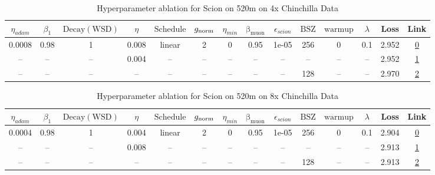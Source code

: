\begin{table}[H]
\centering
\caption{Hyperparameter ablation for Scion on 520m on 4x Chinchilla Data}
\label{tab:ablation_scion_520m_on_4x_chinchilla_data}
\begin{tabular}{cccccccccccccc}
\toprule
$\eta_{adam}$ & $\beta_1$ & $\mathrm{Decay (WSD)}$ & $\eta$ & $\mathrm{Schedule}$ & $g_{\mathrm{norm}}$ & $\eta_{min}$ & $\mathrm{\beta_{muon}}$ & $\epsilon_{scion}$ & $\mathrm{BSZ}$ & $\mathrm{warmup}$ & $\lambda$ & Loss & Link \\
\midrule
0.0008 & 0.98 & 1 & 0.008 & linear & 2 & 0 & 0.95 & 1e-05 & 256 & 0 & 0.1 & 2.952 & \href{https://wandb.ai/marin-community/optimizer-scaling/runs/sweep-520m-42B-scion941d43lr0.008-wd0.1-minlr0-warmup0-b10.98-gn-ab5aa7}{0} \\
\midrule
-- & -- & -- & 0.004 & -- & -- & -- & -- & -- & -- & -- & -- & 2.952 & \href{https://wandb.ai/marin-community/optimizer-scaling/runs/sweep-520m-42B-scion268e92lr0.004-wd0.1-minlr0-warmup0-b10.98-gn-26c45d}{1} \\
-- & -- & -- & -- & -- & -- & -- & -- & -- & 128 & -- & -- & 2.970 & \href{https://wandb.ai/marin-community/optimizer-scaling/runs/sweep-520m-42B-scion32fc90lr0.008-wd0.1-minlr0-warmup0-b10.98-gn-202a50}{2} \\
\bottomrule
\end{tabular}
\end{table}

\begin{table}[H]
\centering
\caption{Hyperparameter ablation for Scion on 520m on 8x Chinchilla Data}
\label{tab:ablation_scion_520m_on_8x_chinchilla_data}
\begin{tabular}{cccccccccccccc}
\toprule
$\eta_{adam}$ & $\beta_1$ & $\mathrm{Decay (WSD)}$ & $\eta$ & $\mathrm{Schedule}$ & $g_{\mathrm{norm}}$ & $\eta_{min}$ & $\mathrm{\beta_{muon}}$ & $\epsilon_{scion}$ & $\mathrm{BSZ}$ & $\mathrm{warmup}$ & $\lambda$ & Loss & Link \\
\midrule
0.0004 & 0.98 & 1 & 0.004 & linear & 2 & 0 & 0.95 & 1e-05 & 256 & 0 & 0.1 & 2.904 & \href{https://wandb.ai/marin-community/optimizer-scaling/runs/sweep-520m-85B-scionbe58eblr0.004-wd0.1-minlr0-warmup0-b10.98-gn-7658bc}{0} \\
\midrule
-- & -- & -- & 0.008 & -- & -- & -- & -- & -- & -- & -- & -- & 2.913 & \href{https://wandb.ai/marin-community/optimizer-scaling/runs/sweep-520m-85B-scion32fc90lr0.008-wd0.1-minlr0-warmup0-b10.98-gn-2fad85}{1} \\
-- & -- & -- & -- & -- & -- & -- & -- & -- & 128 & -- & -- & 2.913 & \href{https://wandb.ai/marin-community/optimizer-scaling/runs/sweep-520m-85B-scion6cf4fblr0.004-wd0.1-minlr0-warmup0-b10.98-gn-ec60f2}{2} \\
\bottomrule
\end{tabular}
\end{table}

